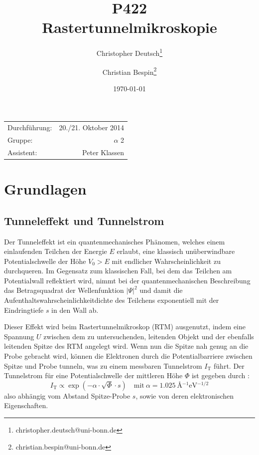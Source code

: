 \documentclass[10pt, a4paper]{article}
\title{P422 \\ Rastertunnelmikroskopie}
\author{Christopher Deutsch\footnote{christopher.deutsch@uni-bonn.de} \and Christian Bespin\footnote{christian.bespin@uni-bonn.de}}
\date{\today}
\begin{document}
  
\maketitle

\begin{center}
\begin{tabular}{l r}
Durchführung: & 20./21. Oktober 2014 \\
Gruppe: &$\alpha$ 2 \\
Assistent: & Peter Klassen
\end{tabular}
\end{center}

\begin{abstract}
\end{abstract}

\tableofcontents
\newpage

\section{Grundlagen}

\subsection{Tunneleffekt und Tunnelstrom}
Der Tunneleffekt ist ein quantenmechanisches Phänomen, welches einem einlaufenden Teilchen der Energie $E$ erlaubt, eine klassisch unüberwindbare Potentialschwelle der Höhe $V_0 > E$ mit endlicher Wahrscheinlichkeit zu durchqueren.
Im Gegensatz zum klassischen Fall, bei dem das Teilchen am Potentialwall reflektiert wird, nimmt bei der quantenmechanischen Beschreibung das Betragsquadrat der Wellenfunktion $|\Psi|^2$ und damit die Aufenthaltswahrscheinlichkeitdichte des Teilchens exponentiell mit der Eindringtiefe $s$ in den Wall ab.

Dieser Effekt wird beim Rastertunnelmikroskop (RTM) ausgenutzt, indem eine Spannung $U$ zwischen dem zu untersuchenden, leitenden Objekt und der ebenfalls leitenden Spitze des RTM angelegt wird.
Wenn nun die Spitze nah genug an die Probe gebracht wird, können die Elektronen durch die Potentialbarriere zwischen Spitze und Probe tunneln, was zu einem messbaren Tunnelstrom $I_\mathrm{T}$ führt.
Der Tunnelstrom für eine Potentialschwelle der mittleren Höhe $\Phi$ ist gegeben durch \cite{binning}:
\begin{equation}
  I_\mathrm{T} \propto \exp(-\alpha \cdot \sqrt{\Phi} \cdot s) \quad \text{mit}\: \alpha = \SI{1,025}{\angstrom^{-1}\electronvolt^{-1/2}}
  \label{eq:tunnelstrom}
\end{equation}
also abhängig vom Abstand Spitze-Probe $s$, sowie von deren elektronischen Eigenschaften.
\end{document}
